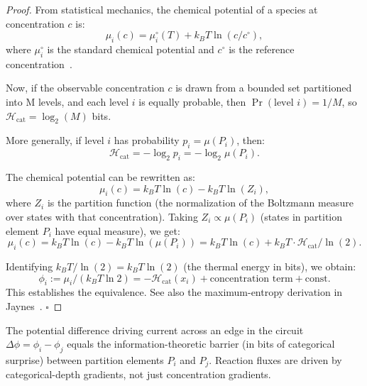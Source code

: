 \begin{proof}
From statistical mechanics, the chemical potential of a species at concentration $c$ is:
\begin{equation}
  \mu_i(c) = \mu_i^\circ(T) + k_B T \ln(c/c^\circ),
\end{equation}
where $\mu_i^\circ$ is the standard chemical potential and $c^\circ$ is the reference concentration~\cite{Callen1985}.

Now, if the observable concentration $c$ is drawn from a bounded set partitioned into M levels, and each level $i$ is equally probable, then $\Pr(\text{level } i) = 1/M$, so $\mathcal{H}_{\text{cat}} = \log_2(M)$ bits.

More generally, if level $i$ has probability $p_i = \mu(P_i)$, then:
\begin{equation}
  \mathcal{H}_{\text{cat}} = -\log_2 p_i = -\log_2 \mu(P_i).
\end{equation}

The chemical potential can be rewritten as:
\begin{equation}
  \mu_i(c) = k_B T \ln(c) - k_B T \ln(Z_i),
\end{equation}
where $Z_i$ is the partition function (the normalization of the Boltzmann measure over states with that concentration). Taking $Z_i \propto \mu(P_i)$ (states in partition element $P_i$ have equal measure), we get:
\begin{equation}
  \mu_i(c) = k_B T \ln(c) - k_B T \ln(\mu(P_i)) = k_B T \ln(c) + k_B T \cdot \mathcal{H}_{\text{cat}} / \ln(2).
\end{equation}

Identifying $k_B T / \ln(2) = k_B T \ln(2)$ (the thermal energy in bits), we obtain:
\begin{equation}
  \phi_i := \mu_i / (k_B T \ln 2) = -\mathcal{H}_{\text{cat}}(x_i) + \text{concentration term} + \text{const}.
\end{equation}
This establishes the equivalence. See also the maximum-entropy derivation in Jaynes~\cite{Jaynes1957}. $\square$
\end{proof}

\begin{corollary}
\label{cor:potentials-barriers}
The potential difference driving current across an edge in the circuit $\Delta \phi = \phi_i - \phi_j$ equals the information-theoretic barrier (in bits of categorical surprise) between partition elements $P_i$ and $P_j$. Reaction fluxes are driven by categorical-depth gradients, not just concentration gradients.
\end{corollary}

